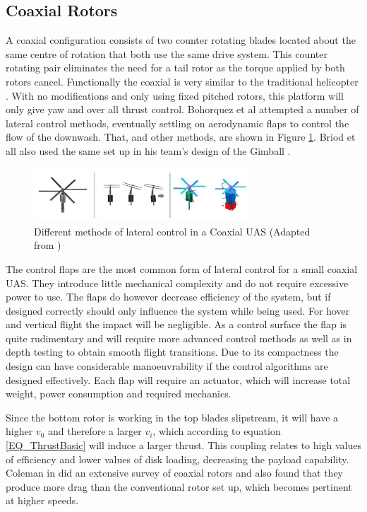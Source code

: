 \documentclass[a4paper, 10pt, conference]{ieeeconf}
\begin{document}
\subsection{Coaxial Rotors}
A coaxial configuration consists of two counter rotating blades located about the same centre of rotation that both use the same drive system. This counter rotating pair eliminates the need for a tail rotor as the torque applied by both rotors cancel. Functionally the coaxial is very similar to the traditional helicopter \cite{NasaCoaxial}. With no modifications and only using fixed pitched rotors, this platform will only give yaw and over all thrust control. Bohorquez et al \cite{Bohorquez} attempted a number of lateral control methods, eventually settling on aerodynamic flaps to control the flow of the downwash. That, and other methods, are shown in Figure \ref{IM_Coaxial_Variations}. Briod et all also used the same set up in his team's design of the Gimball \cite{Briod2012}.
 
\begin{figure}[b]
	\centering
	\includegraphics[height = 2cm]{Images/Literature/Coaxial_Configs}     
	\caption{Different methods of lateral control in a Coaxial UAS (Adapted from \cite{Bohorquez})}
	\label{IM_Coaxial_Variations}
\end{figure}

The control flaps are the most common form of lateral control for a small coaxial UAS. They introduce little mechanical complexity and do not require excessive power to use. The flaps do however decrease efficiency of the system, but if designed correctly should only influence the system while being used. For hover and vertical flight the impact will be negligible. As a control surface the flap is quite rudimentary and will require more advanced control methods as well as in depth testing to obtain smooth flight transitions. Due to its compactness the design can have considerable manoeuvrability if the control algorithms are designed effectively. Each flap will require an actuator, which will increase total weight, power consumption and required mechanics.

Since the bottom rotor is working in the top blades slipstream, it will have a higher $v_0$ and therefore a larger $v_i$, which according to equation \ref{EQ_ThrustBasic} will induce a larger thrust. This coupling relates to high values of efficiency and lower values of disk loading, decreasing the payload capability. Coleman in \cite{NasaCoaxial} did an extensive survey of coaxial rotors and also found that they produce more drag than the conventional rotor set up, which becomes pertinent at higher speeds.
\end{document}
